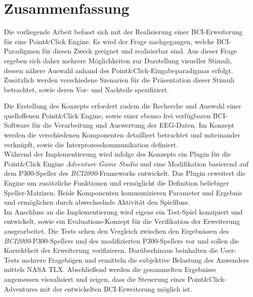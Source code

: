 \chapter*{Zusammenfassung}

Die vorliegende Arbeit befasst sich mit der Realisierung einer \acs{BCI}-Erweiterung für eine Point\&Click Engine.
Es wird der Frage nachgegangen, welche \acs{BCI}-Paradigmen für diesen Zweck geeignet und realisierbar sind.
Aus dieser Frage ergeben sich daher mehrere Möglichkeiten zur Darstellung visueller Stimuli, dessen nähere Auswahl anhand des Point\&Click-Eingabeparadigmas erfolgt.
Zusätzlich werden verschiedene Szenarien für die Präsentation dieser Stimuli betrachtet, sowie deren Vor- und Nachteile spezifiziert.

Die Erstellung des Konzepts erfordert zudem die Recherche und Auswahl einer quell\-offenen Point\&Click Engine, sowie einer ebenso frei verfügbaren BCI-Software für die Verarbeitung und Auswertung der EEG-Daten.
Im Konzept werden die verschiedenen Komponenten detailliert betrachtet und miteinander verknüpft, sowie die Interprozesskommunikation definiert.\\
Während der Implementierung wird infolge des Konzepts ein Plugin für die Point\&\-Click Engine \textit{Adventure Game Studio} und eine Modifikation basierend auf dem P300-Speller des \textit{BCI2000}-Frameworks entwickelt.
Das Plugin erweitert die Engine um zusätzliche Funktionen und ermöglicht die Definition beliebiger Speller-Matrizen.
Beide Komponenten kommunizieren Parameter und Ergebnis und ermöglichen durch abwechselnde Aktivität den Spielfluss.\\
Im Anschluss an die Implementierung wird eigens ein Test-Spiel konzipiert und entwickelt, sowie ein Evaluations-Konzept für die Verifikation der Erweiterung ausgearbeitet.
Die Tests sehen den Vergleich zwischen den Ergebnissen des \textit{BCI2000}-P300-Spellers und des modifizierten P300-Spellers vor und sollen die Korrektheit der Erweiterung verifizieren.
Darüberhinaus beinhalten die User-Tests mehrere Fragebögen und ermitteln die subjektive Belastung des Anwenders mittels NASA TLX.
Abschließend werden die gesammelten Ergebnisse angemessen visualisiert und zeigen, dass die Steuerung eines Point\&Click-Adventures mit der entwickelten \acs{BCI}-Erweiterung möglich ist.\\
